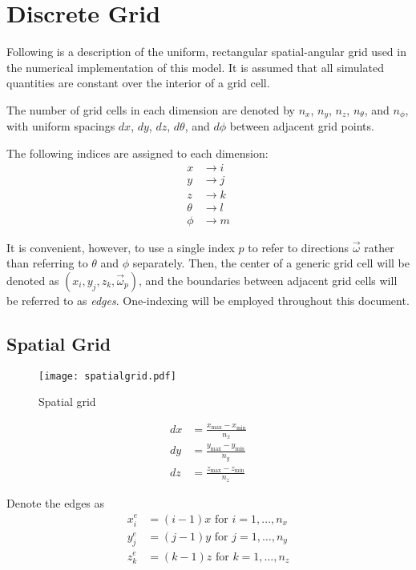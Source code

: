 \section{Discrete Grid}
Following is a description of the uniform, rectangular spatial-angular grid used
in the numerical implementation of this model.
It is assumed that all simulated quantities are constant over the interior of a
grid cell.

The number of grid cells in each dimension are denoted by $n_x$, $n_y$, $n_z$,
$n_\theta$, and $n_\phi$, with uniform spacings $dx$, $dy$, $dz$, $d\theta$, and
$d\phi$ between adjacent grid points.

The following indices are assigned to each dimension:
\begin{align}
  x &\to i \\
  y &\to j \\
  z &\to k \\
  \theta &\to l \\
  \phi &\to m
\end{align}

It is convenient, however, to use a single index $p$ to refer to directions $\vec{\omega}$ rather than referring to $\theta$ and $\phi$ separately.
Then, the center of a generic grid cell will be denoted as
$(x_i, y_j, z_k, \vec{\omega}_p)$, and the boundaries between adjacent grid cells
will be referred to as \textit{edges}.
One-indexing will be employed throughout this document.

\subsection{Spatial Grid}
\begin{figure}[H]
  \centering
  \texttt{[image: spatialgrid.pdf]}
  \caption{Spatial grid}
  \label{fig:spatial_grid}
\end{figure}

\begin{align}
  dx &= \frac{x_{\max}-x_{\min}}{n_x} \\ 
  dy &= \frac{y_{\max}-y_{\min}}{n_y} \\ 
  dz &= \frac{z_{\max}-z_{\min}}{n_z}
\end{align}

Denote the edges as 
\begin{align}
  x_i^e &= (i-1)x \mbox{ for } i=1,\ldots,n_x \\
  y_j^e &= (j-1)y \mbox{ for } j=1,\ldots,n_y \\
  z_k^e &= (k-1)z \mbox{ for } k=1,\ldots,n_z 
\end{align}

